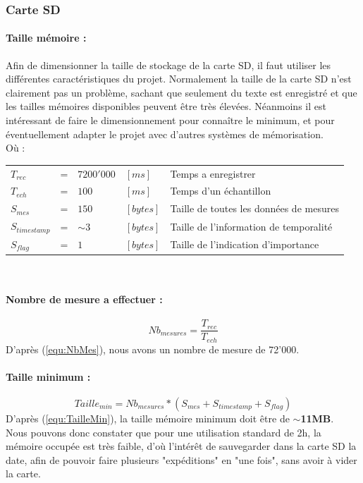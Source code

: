 {{}

\newpage
\subsubsection{Carte SD} \label{sssec:CarteSD}
{
    \paragraph{Taille mémoire : }
    Afin de dimensionner la taille de stockage de la carte SD, il faut utiliser les différentes caractéristiques du projet. Normalement la taille de la carte SD n'est clairement pas un problème, sachant que seulement du texte est enregistré et que les tailles mémoires disponibles peuvent être très élevées. Néanmoins il est intéressant de faire le dimensionnement pour connaître le minimum, et pour éventuellement adapter le projet avec d'autres systèmes de mémorisation.  \\
    Où : \vspace{+14pt} \\
    \begin{tabular}{l l ll|l}
       $ T_{rec} $ & = &  $7200'000$ & $[ms]$ & Temps a enregistrer \\
       $ T_{ech}$ & = & $100$  & $[ms]$ & Temps d'un échantillon \\
       $ S_{mes} $ & = & $150$ & $[bytes]$ & Taille de toutes les données de mesures  \\
       $ S_{timestamp} $ & = & $\sim$3 & $[bytes]$ & Taille de l'information de temporalité  \\
       $ S_{flag} $ & = & $ 1 $ & $[bytes]$ & Taille de l'indication d'importance 
    \end{tabular}
    \vspace{+14pt}
    \\
   \paragraph{ Nombre de mesure a effectuer :}
    \begin{equation} \label{equ:NbMes}
        Nb_{mesures} = \frac{T_{rec}}{T_{ech}}
    \end{equation} 
    D'après (\ref{equ:NbMes}), nous avons un nombre de mesure de 72'000.  \vspace{+8pt} \\
    
   \paragraph{Taille minimum :}
    \begin{equation} \label{equ:TailleMin}
        Taille_{min} = Nb_{mesures} * (S_{mes}+S_{timestamp}+S_{flag}) 
    \end{equation}
    D'après (\ref{equ:TailleMin}), la taille mémoire minimum doit être de \textbf{$\sim$11MB}. \vspace{+8pt} \\ 
    Nous pouvons donc constater que pour une utilisation standard de 2h, la mémoire occupée est très faible, d'où l'intérêt de sauvegarder dans la carte SD la date, afin de pouvoir faire plusieurs "expéditions" en "une fois", sans avoir à vider la carte.
}

}
